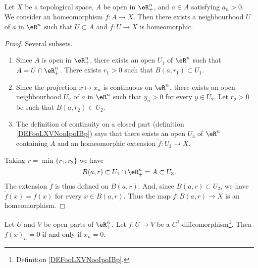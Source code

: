 \begin{lemma}	\label{LEMooWZOBooGrvNGQ}
	Let \( X\) be a topological space, \( A\) be open in \( \eR^n_+\), and \( a\in A\) satisfying \( a_n>0\). We consider an homeomorphism \(f \colon A\to X  \). Then there exists a neighbourhood \( U\) of \( a\) in \( \eR^n\) such that \( U\subset A\) and \(f \colon U\to X  \) is homeomorphic.
\end{lemma}

\begin{proof}
	Several subsets.
	\begin{enumerate}
		\item
		      Since \( A\) is open in \( \eR^n_+\), there exists an open \( U_1\) of \( \eR^n\) such that \( A=U\cap \eR^n_+\). There exists \( r_1>0\) such that \( B(a,r_1)\subset U_1\).
		\item

		      Since the projection \( x\mapsto x_n\) is continuous on \( \eR^n\), there exists an open neighbourhood \( U_2\) of \( a\) in \( \eR^n\) such that \( y_n>0\) for every \( y\in U_2\). Let \( r_2>0\) be such that \( B(a,r_2)\subset U_2\).
		\item
		      The definition of continuity on a closed part (definition \ref{DEFooLXVNooIpoIBp}) says that there exists an open \( U_3 \) of \( \eR^n\) containing \( A\) and an homeomorphic extension \(\tilde f \colon U_3\to X  \).
	\end{enumerate}
	Taking \( r=\min\{r_1,r_2\}\) we have
	\begin{equation}
		B(a,r)\subset U_1\cap\eR^n_+=A\subset U_3.
	\end{equation}
	The extension \( \tilde f\) is thus defined on \( B(a,r)\). And, since \( B(a,r)\subset U_2\), we have \( \tilde f(x)=f(x)\) for every \( x\in B(a,r)\). Thus the map \( f \colon B(a,r)\to X  \) is an homeomorphism.
\end{proof}

\begin{lemma}	\label{LEMooLPXFooUBLCqA}
	Let \( U\) and \( V\) be open parts of \( \eR^n_+\). Let \(f \colon U\to V  \) be a \( C^1\)-diffeomorphism\footnote{Definition \ref{DEFooLXVNooIpoIBp}.}. Then \( f(x)_n=0\) if and only if \( x_n=0\).
\end{lemma}

